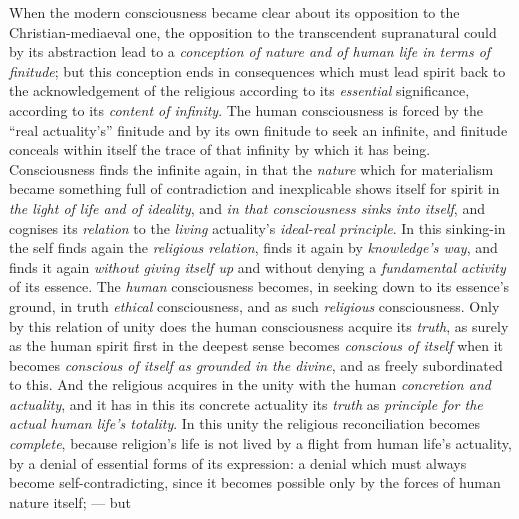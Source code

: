 \documentclass[12pt,a4paper]{book}
\begin{document}
\begin{enumerate}[label=\arabic*., leftmargin=*, labelsep=1em,
                  topsep=0.35\baselineskip, itemsep=0.35\baselineskip]
  When the modern consciousness became clear about its opposition to the
  Christian-mediaeval one, the opposition to the transcendent supranatural could
  by its abstraction lead to a \emph{conception of nature and of human life in
  terms of finitude}; but this conception ends in consequences which must lead
  spirit back to the acknowledgement of the religious according to its
  \emph{essential} significance, according to its \emph{content of infinity}.
  The human consciousness is forced by the ``real actuality's'' finitude and by
  its own finitude to seek an infinite, and finitude conceals within itself the
  trace of that infinity by which it has being. Consciousness finds the infinite
  again, in that the \emph{nature} which for materialism became something full
  of contradiction and inexplicable shows itself
  for spirit in \emph{the light of life and of ideality}, and \emph{in that
  consciousness sinks into itself}, and cognises its \emph{relation} to the
  \emph{living} actuality's \emph{ideal-real principle}. In this sinking-in the
  self finds again the \emph{religious relation}, finds it again by
  \emph{knowledge's way}, and finds it again \emph{without giving itself up} and
  without denying a \emph{fundamental activity} of its essence. The
  \emph{human} consciousness becomes, in seeking down to its essence's ground,
  in truth \emph{ethical} consciousness, and as such \emph{religious}
  consciousness. Only by this relation of unity does the human consciousness
  acquire its \emph{truth}, as surely as the human spirit first in the deepest
  sense becomes \emph{conscious of itself} when it becomes \emph{conscious of
  itself as grounded in the divine}, and as freely subordinated to this. And the
  religious acquires in the unity with the human \emph{concretion and
  actuality}, and it has in this its concrete actuality its \emph{truth} as
  \emph{principle for the actual human life's totality}. In this unity the
  religious reconciliation becomes \emph{complete}, because religion's life is
  not lived by a flight from human life's actuality, by a denial of essential
  forms of its expression: a denial which must always become self-contradicting,
  since it becomes possible only by the forces of human nature itself; --- but

\end{enumerate}
\end{document}
